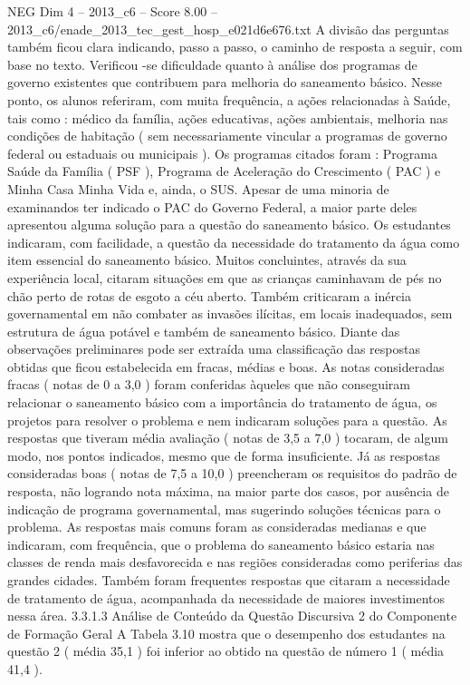 \begin{textsample}{NEG Dim 4 – 2013\_c6 – Score 8.00 – 2013\_c6/enade\_2013\_tec\_gest\_hosp\_e021d6e676.txt}
A divisão das perguntas também ficou clara indicando, passo a passo, o caminho de resposta a seguir, com base no texto.
Verificou -se dificuldade quanto à análise dos programas de governo existentes que contribuem para melhoria do saneamento básico.
Nesse ponto, os alunos referiram, com muita frequência, a ações relacionadas à Saúde, tais como : médico da família, ações educativas, ações ambientais, melhoria nas condições de habitação ( sem necessariamente vincular a programas de governo federal ou estaduais ou municipais ).
Os programas citados foram : Programa Saúde da Família ( PSF ), Programa de Aceleração do Crescimento ( PAC ) e Minha Casa Minha Vida e, ainda, o SUS.
Apesar de uma minoria de examinandos ter indicado o PAC do Governo Federal, a maior parte deles apresentou alguma solução para a questão do saneamento básico.
Os estudantes indicaram, com facilidade, a questão da necessidade do tratamento da água como item essencial do saneamento básico.
Muitos concluintes, através da sua experiência local, citaram situações em que as crianças caminhavam de pés no chão perto de rotas de esgoto a céu aberto.
Também criticaram a inércia governamental em não combater as invasões ilícitas, em locais inadequados, sem estrutura de água potável e também de saneamento básico.
Diante das observações preliminares pode ser extraída uma classificação das respostas obtidas que ficou estabelecida em fracas, médias e boas.
As notas consideradas fracas ( notas de 0 a 3,0 ) foram conferidas àqueles que não conseguiram relacionar o saneamento básico com a importância do tratamento de água, os projetos para resolver o problema e nem indicaram soluções para a questão.
As respostas que tiveram média avaliação ( notas de 3,5 a 7,0 ) tocaram, de algum modo, nos pontos indicados, mesmo que de forma insuficiente.
Já as respostas consideradas boas ( notas de 7,5 a 10,0 ) preencheram os requisitos do padrão de resposta, não logrando nota máxima, na maior parte dos casos, por ausência de indicação de programa governamental, mas sugerindo soluções técnicas para o problema.
As respostas mais comuns foram as consideradas medianas e que indicaram, com frequência, que o problema do saneamento básico estaria nas classes de renda mais desfavorecida e nas regiões consideradas como periferias das grandes cidades.
Também foram frequentes respostas que citaram a necessidade de tratamento de água, acompanhada da necessidade de maiores investimentos nessa área. 3.3.1.3 Análise de Conteúdo da Questão Discursiva 2 do Componente de Formação Geral A Tabela 3.10 mostra que o desempenho dos estudantes na questão 2 ( média 35,1 ) foi inferior ao obtido na questão de número 1 ( média 41,4 ).

\end{textsample}
